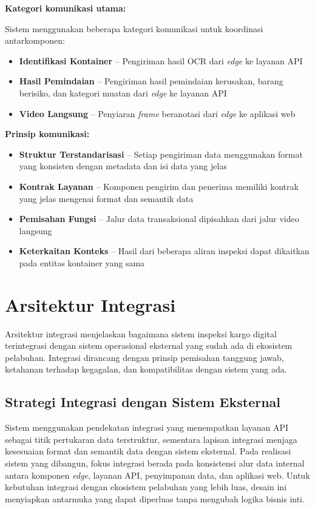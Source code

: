 \textbf{Kategori komunikasi utama:}

Sistem menggunakan beberapa kategori komunikasi untuk koordinasi antarkomponen:
\begin{itemize}
  \item \textbf{Identifikasi Kontainer} -- Pengiriman hasil OCR dari \textit{edge} ke layanan API
  \item \textbf{Hasil Pemindaian} -- Pengiriman hasil pemindaian kerusakan, barang berisiko, dan kategori muatan dari \textit{edge} ke layanan API
  \item \textbf{Video Langsung} -- Penyiaran \textit{frame} beranotasi dari \textit{edge} ke aplikasi web
\end{itemize}

\textbf{Prinsip komunikasi:}

\begin{itemize}
  \item \textbf{Struktur Terstandarisasi} -- Setiap pengiriman data menggunakan format yang konsisten dengan metadata dan isi data yang jelas
  \item \textbf{Kontrak Layanan} -- Komponen pengirim dan penerima memiliki kontrak yang jelas mengenai format dan semantik data
  \item \textbf{Pemisahan Fungsi} -- Jalur data transaksional dipisahkan dari jalur video langsung
  \item \textbf{Keterkaitan Konteks} -- Hasil dari beberapa aliran inspeksi dapat dikaitkan pada entitas kontainer yang sama
\end{itemize}

\section{Arsitektur Integrasi}

Arsitektur integrasi menjelaskan bagaimana sistem inspeksi kargo digital terintegrasi dengan sistem operasional eksternal yang sudah ada di ekosistem pelabuhan. Integrasi dirancang dengan prinsip pemisahan tanggung jawab, ketahanan terhadap kegagalan, dan kompatibilitas dengan sistem yang ada.

\subsection{Strategi Integrasi dengan Sistem Eksternal}

Sistem menggunakan pendekatan integrasi yang menempatkan layanan API sebagai
titik pertukaran data terstruktur, sementara lapisan integrasi menjaga
kesesuaian format dan semantik data dengan sistem eksternal. Pada realisasi
sistem yang dibangun, fokus integrasi berada pada konsistensi alur data
internal antara komponen \textit{edge}, layanan API, penyimpanan data, dan
aplikasi web. Untuk kebutuhan integrasi dengan ekosistem pelabuhan yang lebih
luas, desain ini menyiapkan antarmuka yang dapat diperluas tanpa mengubah
logika bisnis inti.

